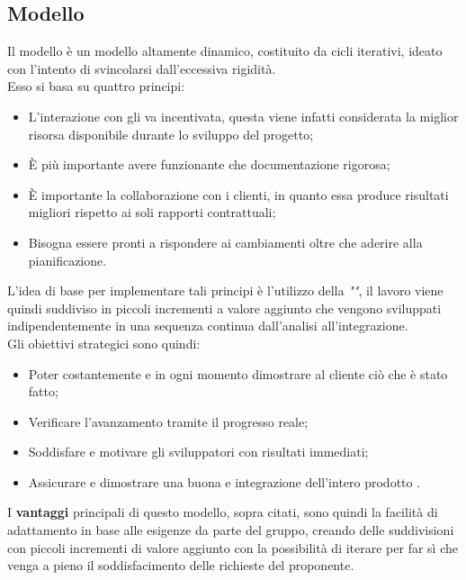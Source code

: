 \subsection{Modello }
\label{sec:modello_agile}
Il modello  è un modello altamente dinamico, costituito da cicli iterativi, ideato con l'intento di svincolarsi dall'eccessiva rigidità.\\ Esso si basa su quattro principi:
	\begin{itemize}
		\item L'interazione con gli  va incentivata, questa viene infatti considerata la miglior risorsa disponibile durante lo sviluppo del progetto;
		\item È più importante avere  funzionante che documentazione rigorosa;
		\item È importante la collaborazione con i clienti, in quanto essa produce risultati migliori rispetto ai soli rapporti contrattuali;
		\item Bisogna essere pronti a rispondere ai cambiamenti oltre che aderire alla pianificazione.
	\end{itemize}
L'idea di base per implementare tali principi è l'utilizzo della \textit{""}, il lavoro viene quindi suddiviso in piccoli incrementi a valore aggiunto che vengono sviluppati indipendentemente in una sequenza continua dall'analisi all'integrazione.\\ Gli obiettivi strategici sono quindi:
	\begin{itemize}
		\item Poter costantemente e in ogni momento dimostrare al cliente ciò che è stato fatto;
		\item Verificare l'avanzamento tramite il progresso reale;
		\item Soddisfare e motivare gli sviluppatori con risultati immediati;
		\item Assicurare e dimostrare una buona  e integrazione dell'intero prodotto . 
	\end{itemize}
I \textbf{vantaggi} principali di questo modello, sopra citati, sono quindi la facilità di adattamento in base alle esigenze da parte del gruppo, creando delle suddivisioni con piccoli incrementi di valore aggiunto con la possibilità di iterare per far sì che venga a pieno il soddisfacimento delle richieste del proponente.
